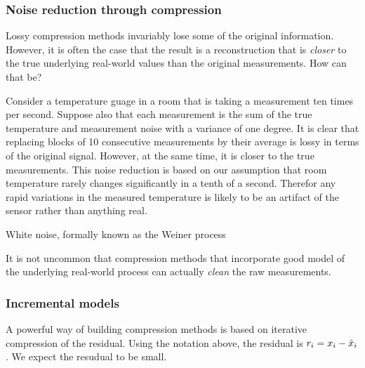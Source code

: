 {\subsubsection{Noise reduction through compression}
Lossy compression methods invariably lose some of the original
information. However, it is often the case that the result is a
reconstruction that is {\em closer} to the true underlying real-world
values than the original measurements. How can that be?

Consider a temperature guage in a room that is taking a measurement
ten times per second. Suppose also that each measurement is the sum of
the true temperature and measurement noise with a variance of one
degree.  It is clear that replacing blocks of 10 consecutive
measurements by their average is lossy in terms of the original
signal. However, at the same time, it is closer to the true
measurements. This noise reduction is based on our assumption that
room temperature rarely changes significantly in a tenth of a
second. Therefor any rapid variations in the measured temperature is
likely to be an artifact of the sensor rather than anything real.


White noise, formally known as the Weiner process

It is not uncommon that compression methods that
incorporate good model of the underlying real-world process can
actually {\em clean} the raw measurements.

\subsubsection{Incremental models}
A powerful way of building compression methods is based on iterative
compression of the residual. Using the notation above, the residual is 
$r_i=x_i - \hat{x}_i$. We expect the resudual to be small.}

